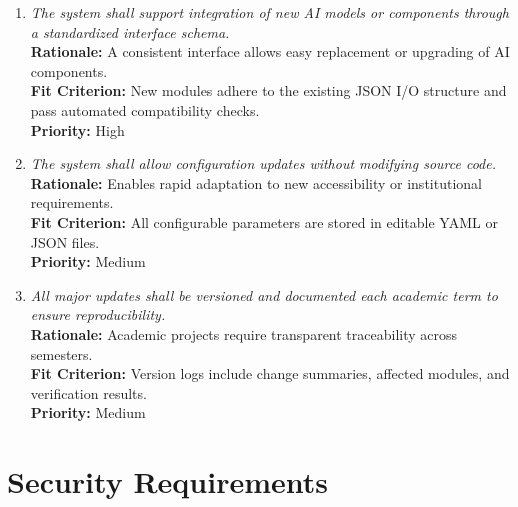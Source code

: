 \documentclass[12pt]{article}
\begin{document}
\begin{enumerate}[label=MS-AD\arabic*., wide=0pt, leftmargin=*]
  \item \emph{The system shall support integration of new AI models or components through a standardized interface schema.}\\[2mm]
    {\bf Rationale:} A consistent interface allows easy replacement or upgrading of AI components.\\
    {\bf Fit Criterion:} New modules adhere to the existing JSON I/O structure and pass automated compatibility checks.\\
    {\bf Priority:} High

  \item \emph{The system shall allow configuration updates without modifying source code.}\\[2mm]
    {\bf Rationale:} Enables rapid adaptation to new accessibility or institutional requirements.\\
    {\bf Fit Criterion:} All configurable parameters are stored in editable YAML or JSON files.\\
    {\bf Priority:} Medium

  \item \emph{All major updates shall be versioned and documented each academic term to ensure reproducibility.}\\[2mm]
    {\bf Rationale:} Academic projects require transparent traceability across semesters.\\
    {\bf Fit Criterion:} Version logs include change summaries, affected modules, and verification results.\\
    {\bf Priority:} Medium
\end{enumerate}



\section{Security Requirements}
\end{document}

